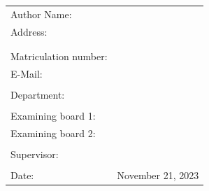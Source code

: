 \begin{titlepage}
	\sffamily

	\begin{figure}%
		\centering
		\qquad
	\end{figure}

	\vspace{2.5cm}

	\begin{center}
		\huge{\thesistitle}

		\vspace{3cm}

		\renewcommand{\baselinestretch}{1.3}
		\Large{\thesistype}

		\large
		\thesistypedesc
	\end{center}

	\vspace{1.5cm}
	\renewcommand{\baselinestretch}{1}
	\begin{table}[htpb]
		\centering
		\begin{tabular}{ll}
			\\
			Author Name: & \thesisauthorname \\
			Address: & \thesisauthorhomestreet \\
			& \thesisauthorhometown \\
			\\
			Matriculation number: & \thesisauthormatrikelnumber \\
			E-Mail: & \thesisauthoremail \\
			\\
			Department: & \thesisdepartment \\
			\\
			Examining board 1: & \thesisfirstreviewer \\
			Examining board 2: & \thesissecondreviewer \\
			\\
			Supervisor: & \thesissupervisor \\
			\\
			Date: & November 21, 2023 \\
		\end{tabular}
	\end{table}

	\rmfamily
\end{titlepage}
